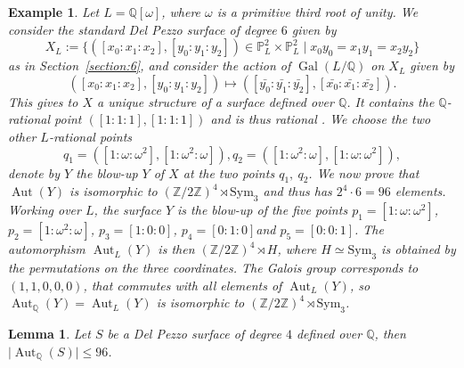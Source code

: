 \documentclass[leqno,12pt]{amsart} %
\newtheorem{lem}[thm]{Lemma}
\newtheorem{ex}[thm]{Example}
\newcommand{\Q}{\ensuremath{\mathbb{Q} }}
\DeclareMathOperator{\Aut}{Aut}
\DeclareMathOperator{\Gal}{Gal}
\begin{document}
\begin{ex}\label{ex-06}
    Let $L=\mathbb{Q}[\omega]$, where $\omega$ is a primitive third root of unity. We consider the standard Del Pezzo surface of degree $6$  given by 
\[X_L:=\{([x_0:x_1:x_2],[y_0:y_1:y_2])\in \mathbb{P}^2_L \times \mathbb{P}^2_L\mid x_0y_0=x_1y_1=x_2y_2\}\]
as in Section~\ref{section:6}, and consider the action of $\Gal(L/\mathbb{Q})$ on $X_L$ given by 
\[([x_0:x_1:x_2],[y_0:y_1:y_2])\mapsto ([\bar{y_0}:\bar{y_1}:\bar{y_2}],[\bar{x_0}:\bar{x_1}:\bar{x_2}]).\]
This gives to $X$ a unique structure of a surface defined over $\mathbb{Q}$. It contains the $\mathbb{Q}$-rational point $([1:1:1],[1:1:1])$ and is thus rational \cite[Theorem 3.15]{MR225780}. We choose the two other $L$-rational points 
\begin{equation*}
    q_1=([1:\omega:\omega^2],[1:\omega^2:\omega]), q_2=([1:\omega^2:\omega],[1:\omega:\omega^2]),
\end{equation*}
denote by $Y$ the blow-up $Y$ of $X$ at the two points $q_1,~q_2$. We now prove that $\Aut(Y)$ is isomorphic to $(\mathbb{Z}/2\mathbb{Z})^4\rtimes \mathrm{Sym}_3$ and thus has $2^4\cdot 6=96$ elements.\\

Working over $L$, the surface $Y$ is the blow-up of the five points $p_1=[1:\omega:\omega^2]$, $p_2=[1:\omega^2:\omega]$, $p_3=[1:0:0]$, $p_4=[0:1:0]$and $p_5=[0:0:1]$. The automorphism $\Aut_L(Y)$ is then $(\mathbb{Z}/2\mathbb{Z})^4\rtimes H$, where $H\simeq \mathrm{Sym}_3$ is obtained by the permutations on the three coordinates. The Galois group corresponds to $(1,1,0,0,0)$, that commutes with all elements of $\Aut_L(Y)$, so $\Aut_{\mathbb{Q}}(Y)=\Aut_L(Y)$ is isomorphic to $(\mathbb{Z}/2\mathbb{Z})^4\rtimes \mathrm{Sym}_3$.
\end{ex}
 
\begin{lem}\label{lemm-25}
Let $S$ be a Del Pezzo surface of degree $4$ defined over $\Q$, then $\mid\Aut_{\Q}(S)\mid\le 96$.
\end{lem}
 
\end{document}
